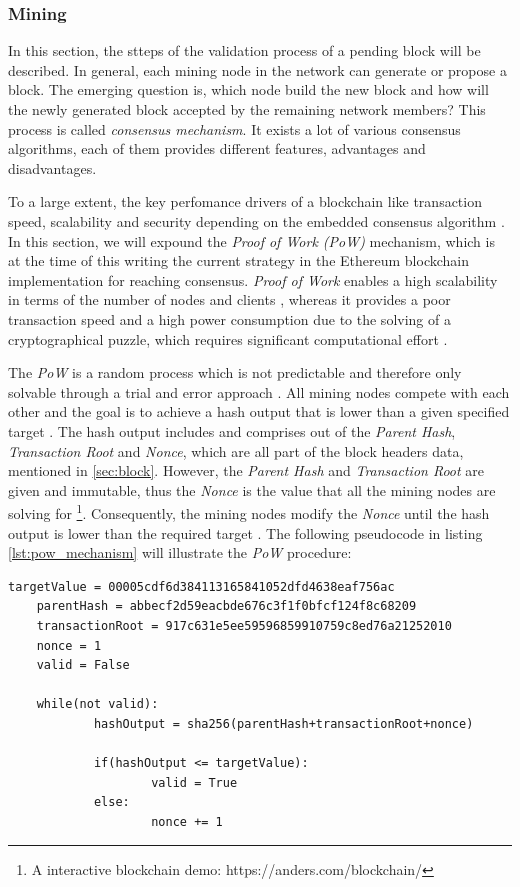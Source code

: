 \subsubsection{Mining}
\label{sec:mining}
In this section, the stteps of the validation process of a pending block will be described. 
In general, each mining node in the network can generate or propose a block. 
The emerging question is, which node build the new block and how will the newly 
generated block accepted by the remaining network members? 
This process is called \textit{consensus mechanism}.
It exists a lot of various consensus algorithms, each of them provides different features,
advantages and disadvantages. 

To a large extent, the key perfomance drivers of a blockchain
like transaction speed, scalability and security depending on the embedded consensus algorithm . 
In this section, we will expound the \textit{Proof of Work (PoW)} mechanism, 
which is at the time of this writing the current strategy in the Ethereum blockchain 
implementation for reaching consensus. 
\textit{Proof of Work} enables a high scalability in terms of the number 
of nodes and clients , whereas it provides a poor transaction speed and a high 
power consumption due to the solving of a cryptographical puzzle, which requires 
significant computational effort . 

The \textit{PoW} is a random process which is not predictable and therefore only solvable through a 
trial and error approach . 
All mining nodes compete with each other and the goal is to achieve a hash output that 
is lower than a given specified target .
The hash output includes and comprises out of the \textit{Parent Hash}, \textit{Transaction Root} and
\textit{Nonce}, which are all part of the block headers data, mentioned in \ref{sec:block}.
However, the \textit{Parent Hash} and \textit{Transaction Root} are given and immutable, thus the \textit{Nonce}
is the value that all the mining nodes are solving for \footnote{A interactive blockchain demo: https://anders.com/blockchain/}.
Consequently, the mining nodes modify the \textit{Nonce} until the hash output is lower than the required target .
The following pseudocode in listing \ref{lst:pow_mechanism} will illustrate the \textit{PoW} procedure:

\vspace{7mm}
\begin{lstlisting}[label={lst:pow_mechanism}, caption={Pseudocode for PoW mechanism}]
	targetValue = 00005cdf6d384113165841052dfd4638eaf756ac
	parentHash = abbecf2d59eacbde676c3f1f0bfcf124f8c68209
	transactionRoot = 917c631e5ee59596859910759c8ed76a21252010
	nonce = 1
	valid = False

	while(not valid):
			hashOutput = sha256(parentHash+transactionRoot+nonce)
		
			if(hashOutput <= targetValue):
					valid = True
			else:
					nonce += 1

\end{lstlisting}
\clearpage

